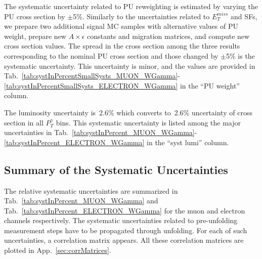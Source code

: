 

The systematic uncertainty related to PU reweighting is estimated by varying the PU cross section by $\pm$5\%. Similarly to the uncertainties related to $E_T^{miss}$ and SFs, we prepare two additional signal MC samples with alternative values of PU weight, prepare new $A \times \epsilon$ constants and migration matrices, and compute new cross section values. The spread in the cross section among the three results corresponding to the nominal PU cross section and those changed by $\pm$5\% is the systematic uncertainty. This uncertainty is minor, and the values are provided in Tab.~\ref{tab:systInPercentSmallSysts_MUON_WGamma}-\ref{tab:systInPercentSmallSysts_ELECTRON_WGamma} in the ``PU weight'' column.

The luminosity uncertainty is~2.6\% which converts to~2.6\% uncertainty of cross section in all $P_T^{\gamma}$ bins. This systematic uncertainty is listed among the major uncertainties in Tab.~\ref{tab:systInPercent_MUON_WGamma}-\ref{tab:systInPercent_ELECTRON_WGamma} in the ``syst lumi'' column.

\subsection{Summary of the Systematic Uncertainties}
\label{sec:Systematics_summary}

The relative systematic uncertainties are summarized in Tab.~\ref{tab:systInPercent_MUON_WGamma} and Tab.~\ref{tab:systInPercent_ELECTRON_WGamma} for the muon and electron channels respectively. The systematic uncertainties related to pre-unfolding measurement steps have to be propagated through unfolding. For each of such uncertainties, a correlation matrix appears. All these correlation matrices are plotted in App.~\ref{sec:corrMatrices}.

